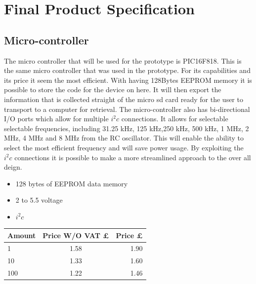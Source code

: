 \documentclass{report}
\begin{document}
\section{Final Product Specification}

\subsection{Micro-controller}
The micro controller that will be used for the prototype is PIC16F818. This is the same micro controller that was used in the prototype. For its capabilities and its price it seem the most efficient. With having 128Bytes EEPROM memory it is possible to store the code for the device on here. It will then export the information that is collected straight of the micro sd card ready for the user to transport to a computer for retrieval. The micro-controller also has bi-directional I/O ports which allow for multiple $i^2c$ connections. It allows for selectable selectable frequencies, including 31.25 kHz, 125 kHz,250 kHz, 500 kHz, 1 MHz, 2 MHz, 4 MHz and 8 MHz from the RC oscillator. This will enable the ability to select the most efficient frequency and will save power usage. By exploiting the $i^2c$ connections it is possible to make a more streamlined approach to the over all deign.
\begin{itemize}
\item 128 bytes of EEPROM data memory
\item 2 to 5.5 voltage
\item $i^2c$
\end{itemize}
\begin{center}
  \begin{tabular}{ | l | c | r |}
    \hline
    Amount & Price W/O VAT £ & Price £ \\ \hline
    1 & 1.58 & 1.90 \\ \hline
    10 & 1.33 & 1.60 \\ \hline
    100 & 1.22 & 1.46   \\ \hline
  \end{tabular}
\end{center}
\end{document}
